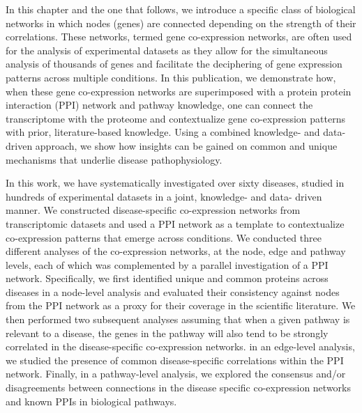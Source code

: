 \noindent
In this chapter and the one that follows, we introduce a specific class of biological networks in which nodes (genes) are connected depending on the strength of their correlations. These networks, termed gene co-expression networks, are often used for the analysis of experimental datasets as they allow for the simultaneous analysis of thousands of genes and facilitate the deciphering of gene expression patterns across multiple conditions. In this publication, we demonstrate how, when these gene co-expression networks are superimposed with a protein protein interaction (PPI) network and pathway knowledge, one can connect the transcriptome with the proteome and contextualize gene co-expression patterns with prior, literature-based knowledge. Using a combined knowledge- and data- driven approach, we show how insights can be gained on common and unique mechanisms that underlie disease pathophysiology. 

In this work, we have systematically investigated over sixty diseases, studied in hundreds of experimental datasets in a joint, knowledge- and data- driven manner. We constructed disease-specific co-expression networks from transcriptomic datasets and used a PPI network as a template to contextualize  co-expression patterns that emerge across conditions. We conducted three different analyses of the co-expression networks, at the node, edge and pathway levels, each of which was complemented by a parallel investigation of a PPI network. Specifically, we first identified unique and common proteins across diseases in a node-level analysis and evaluated their consistency against nodes from the PPI network as a proxy for their coverage in the scientific literature. We then performed two subsequent analyses assuming that when a given pathway is relevant to a disease, the genes in the pathway will also tend to be strongly correlated in the disease-specific co-expression networks. in an edge-level analysis, we studied the presence of common disease-specific correlations within the PPI network. Finally, in a pathway-level analysis, we explored the consensus and/or disagreements between connections in the disease specific co-expression networks and known PPIs in biological pathways. 
